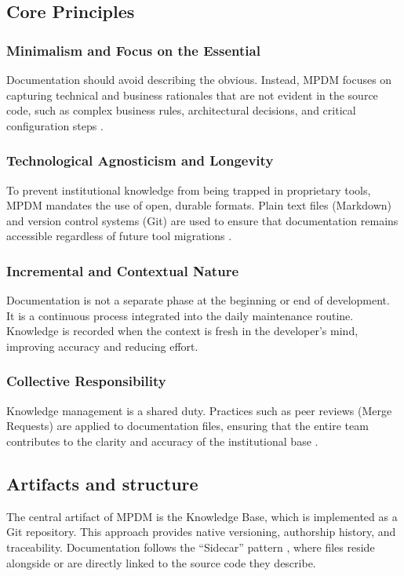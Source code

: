 \documentclass{ieeeaccess}
\begin{document}
\subsection{Core Principles}

\subsubsection{Minimalism and Focus on the Essential}
Documentation should avoid describing the obvious. Instead, MPDM focuses on capturing technical and business rationales that are not evident in the source code, such as complex business rules, architectural decisions, and critical configuration steps \cite{garousi}.

\subsubsection{Technological Agnosticism and Longevity}
To prevent institutional knowledge from being trapped in proprietary tools, MPDM mandates the use of open, durable formats. Plain text files (Markdown) and version control systems (Git) are used to ensure that documentation remains accessible regardless of future tool migrations \cite{jesson}.

\subsubsection{Incremental and Contextual Nature}
Documentation is not a separate phase at the beginning or end of development. It is a continuous process integrated into the daily maintenance routine. Knowledge is recorded when the context is fresh in the developer's mind, improving accuracy and reducing effort.

\subsubsection{Collective Responsibility}
Knowledge management is a shared duty. Practices such as peer reviews (Merge Requests) are applied to documentation files, ensuring that the entire team contributes to the clarity and accuracy of the institutional base \cite{nonaka}.

\subsection{Artifacts and structure}

The central artifact of MPDM is the Knowledge Base, which is implemented as a Git repository. This approach provides native versioning, authorship history, and traceability. Documentation follows the ``Sidecar'' pattern \cite{microsoft}, where files reside alongside or are directly linked to the source code they describe.
\end{document}
